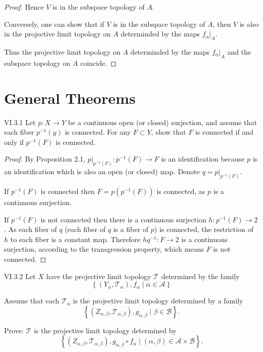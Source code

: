 \begin{proof}
	Hence \( V \) is in the subspace topology of \( A \).

	Conversely, one can show that if \( V \) is in the subspace topology of \( A \), then \( V \) is also in the projective limit topology on \( A \) determinded by the maps \( f_{\alpha}\vert_{A} \).

	Thus the projective limit topology on \( A \) determinded by the maps \( f_{\alpha}\vert_{A} \) and the subspace topology on \( A \) coincide.
\end{proof}

\section{General Theorems}

\begin{problem}{VI.3.1}
Let \( p: X \to Y \) be a continuous open (or closed) surjection, and assume that each fiber \( p^{-1}(y) \) is connected. For any \( F \subset Y \), show that \( F \) is connected if and only if \( p^{-1}(F) \) is connected.
\end{problem}

\begin{proof}
	By Proposition 2.1, \( p\vert_{p^{-1}(F)}: p^{-1}(F) \to F \) is an identification because \( p \) is an identification which is also an open (or closed) map. Denote \( q = p\vert_{p^{-1}(F)} \).

	If \( p^{-1}(F) \) is connected then \( F = p(p^{-1}(F)) \) is connected, as \( p \) is a continuous surjection.

	If \( p^{-1}(F) \) is not connected then there is a continuous surjection \( h: p^{-1}(F) \to 2 \). As each fiber of \( q \) (each fiber of \(q \) is a fiber of \(p\)) is connected, the restriction of \( h \) to each fiber is a constant map. Therefore \( hq^{-1}: F \to 2 \) is a continuous surjection, according to the transgression property, which means \( F \) is not connected.
\end{proof}

\begin{problem}{VI.3.2}
Let \( X \) have the projective limit topology \( \mathscr{T} \) determined by the family
\[
	\left\{ (Y_{\alpha}, \mathscr{T}_{\alpha}), f_{\alpha} \mid \alpha \in \mathscr{A} \right\}
\]

Assume that each \( \mathscr{T}_{\alpha} \) is the projective limit topology determined by a family
\[
	\left\{ (Z_{\alpha, \beta}, \mathscr{T}_{\alpha,\beta}), g_{\alpha,\beta} \mid \beta \in \mathscr{B} \right\}.
\]

Prove: \( \mathscr{T} \) is the projective limit topology determined by
\[
	\left\{ (Z_{\alpha,\beta}, \mathscr{T}_{\alpha,\beta}), g_{\alpha,\beta} \circ f_{\alpha} \mid (\alpha, \beta) \in \mathscr{A} \times \mathscr{B} \right\}.
\]
\end{problem}

